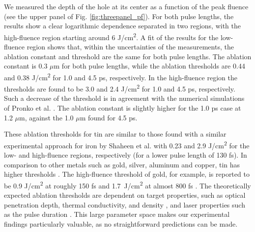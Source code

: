 \documentclass[aip, jap, reprint, amsmath, amssymb]{revtex4-1}
\begin{document}
We measured the depth of the hole at its center as a function of the peak fluence (see the upper panel of Fig. \ref{fig:threepanel_pf}). For both pulse lengths, the results show a clear logarithmic dependence separated in two regions, with the high-fluence region starting around 6 J/cm\textsuperscript{2}. A fit of the results for the low-fluence region shows that, within the uncertainties of the measurements, the ablation constant and threshold are the same for both pulse lengths. The ablation constant is 0.3 $\mu$m for both pulse lengths, while the ablation thresholds are 0.44 and 0.38 J/cm\textsuperscript{2} for 1.0 and 4.5 ps, respectively. In the high-fluence region the thresholds are found to be 3.0 and 2.4 J/cm\textsuperscript{2} for 1.0 and 4.5 ps, respectively. Such a decrease of the threshold is in agreement with the numerical simulations of Pronko et al. \cite{pronko1995}. The ablation constant is slightly higher for the 1.0 ps case at 1.2 $\mu$m, against the 1.0 $\mu$m found for 4.5 ps.

These ablation thresholds for tin are similar to those found with a similar experimental approach for iron by Shaheen et al. \cite{shaheen2013,shaheen2014} with 0.23 and 2.9 J/cm\textsuperscript{2} for the low- and high-fluence regions, respectively (for a lower pulse length of 130 fs). In comparison to other metals such as gold, silver, aluminum and copper, tin has higher thresholds \cite{nolte1997,furusawa1999,toftmann2013}. The high-fluence threshold of gold, for example, is reported to be 0.9 J/cm\textsuperscript{2} at roughly 150 fs\cite{furusawa1999, shaheen2014} and \mbox{1.7 J/cm\textsuperscript{2}} at almost 800 fs \cite{furusawa1999}. The theoretically expected ablation thresholds are dependent on target properties, such as optical penetration depth, thermal conductivity, and density \cite{nolte1997,furusawa1999}, and laser properties such as the pulse duration \cite{nolte1997, furusawa1999, harzic2005}. This large parameter space makes our experimental findings particularly valuable, as no straightforward predictions can be made.
\end{document}
